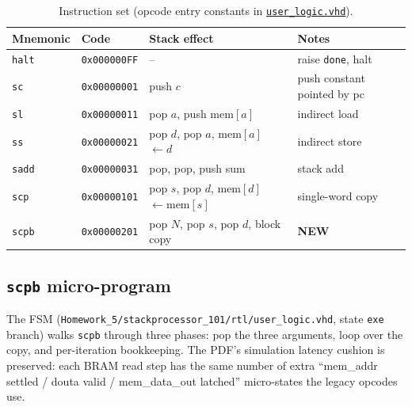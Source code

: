 \documentclass[11pt,letterpaper]{article}
\begin{document}
\begin{table}[H]
    \centering
    \caption{Instruction set (opcode entry constants in
             \href{run:../stackprocessor_101/rtl/user_logic.vhd}{\texttt{user\_logic.vhd}}).}
    \label{tab:isa}
    \small
    \begin{tabular}{llll}
        \toprule
        \textbf{Mnemonic} & \textbf{Code} & \textbf{Stack effect} & \textbf{Notes} \\
        \midrule
        \texttt{halt} & \texttt{0x000000FF} & --                                            & raise \texttt{done}, halt \\
        \texttt{sc}   & \texttt{0x00000001} & push \(c\)                                    & push constant pointed by pc \\
        \texttt{sl}   & \texttt{0x00000011} & pop \(a\), push \(\mathrm{mem}[a]\)           & indirect load \\
        \texttt{ss}   & \texttt{0x00000021} & pop \(d\), pop \(a\), \(\mathrm{mem}[a]\)~\(\leftarrow d\) & indirect store \\
        \texttt{sadd} & \texttt{0x00000031} & pop, pop, push sum                            & stack add \\
        \texttt{scp}  & \texttt{0x00000101} & pop \(s\), pop \(d\), \(\mathrm{mem}[d]\)~\(\leftarrow \mathrm{mem}[s]\) & single-word copy \\
        \texttt{scpb} & \texttt{0x00000201} & pop \(N\), pop \(s\), pop \(d\), block copy   & \textbf{NEW} \\
        \bottomrule
    \end{tabular}
\end{table}

\subsection{\texttt{scpb} micro-program}

The FSM (\texttt{Homework\_5/stackprocessor\_101/rtl/user\_logic.vhd},
state \texttt{exe} branch) walks \texttt{scpb} through three phases:
pop the three arguments, loop over the copy, and per-iteration
bookkeeping. The PDF's simulation latency cushion is preserved: each
BRAM read step has the same number of extra ``mem\_addr settled /
douta valid / mem\_data\_out latched'' micro-states the legacy opcodes
use.
\end{document}
